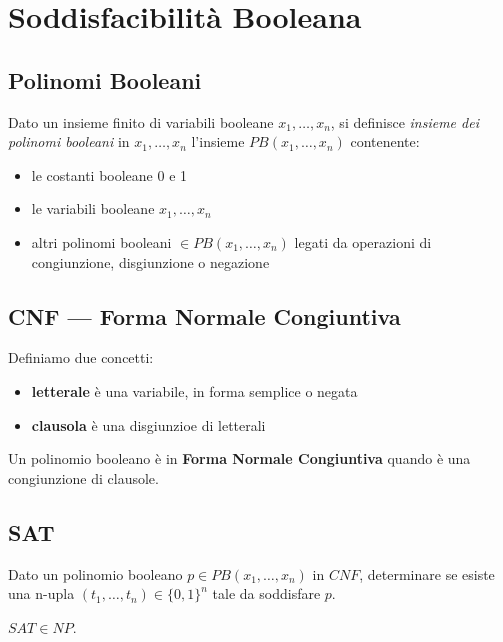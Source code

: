 \section{Soddisfacibilità Booleana}

\subsection{Polinomi Booleani}

Dato un insieme finito di variabili booleane $x_1, \ldots, x_n$, si definisce \textit{insieme dei polinomi booleani} in $x_1, \ldots, x_n$ l'insieme $PB(x_1, \ldots, x_n)$ contenente:
\begin{itemize}
	\item le costanti booleane 0 e 1
	\item le variabili booleane $x_1, \ldots, x_n$
	\item altri polinomi booleani $\in PB(x_1, \ldots, x_n)$ legati da operazioni di congiunzione, disgiunzione o negazione
\end{itemize}

\subsection{CNF --- Forma Normale Congiuntiva}

Definiamo due concetti:
\begin{itemize}
	\item \textbf{letterale} è una variabile, in forma semplice o negata
	\item \textbf{clausola} è una disgiunzioe di letterali
\end{itemize}

\begin{defn}
	Un polinomio booleano è in \textbf{Forma Normale Congiuntiva} quando è una congiunzione di clausole.
\end{defn}

\subsection{SAT}

Dato un polinomio booleano $p \in PB(x_1, \ldots, x_n)$ in $CNF$, determinare se esiste una n-upla $(t_1, \ldots, t_n) \in \{0, 1\}^n$ tale da soddisfare $p$. \\

\begin{lemm}
	$SAT \in NP$.
\end{lemm}

